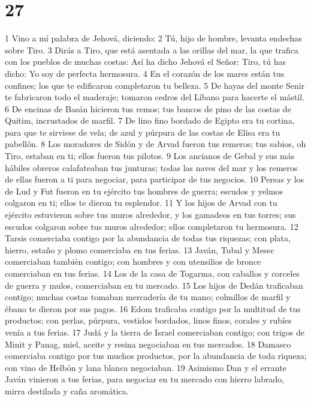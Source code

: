 \chapter{27}

1 Vino a mí palabra de Jehová, diciendo:
2 Tú, hijo de hombre, levanta endechas sobre Tiro.
3 Dirás a Tiro, que está asentada a las orillas del mar, la que trafica con los pueblos de muchas costas: Así ha dicho Jehová el Señor: Tiro, tú has dicho: Yo soy de perfecta hermosura.
4 En el corazón de los mares están tus confines; los que te edificaron completaron tu belleza.
5 De hayas del monte Senir te fabricaron todo el maderaje; tomaron cedros del Líbano para hacerte el mástil.
6 De encinas de Basán hicieron tus remos; tus bancos de pino de las costas de Quitim, incrustados de marfil.
7 De lino fino bordado de Egipto era tu cortina, para que te sirviese de vela; de azul y púrpura de las costas de Elisa era tu pabellón.
8 Los moradores de Sidón y de Arvad fueron tus remeros; tus sabios, oh Tiro, estaban en ti; ellos fueron tus pilotos.
9 Los ancianos de Gebal y sus más hábiles obreros calafateaban tus junturas; todas las naves del mar y los remeros de ellas fueron a ti para negociar, para participar de tus negocios.
10 Persas y los de Lud y Fut fueron en tu ejército tus hombres de guerra; escudos y yelmos colgaron en ti; ellos te dieron tu esplendor.
11 Y los hijos de Arvad con tu ejército estuvieron sobre tus muros alrededor, y los gamadeos en tus torres; sus escudos colgaron sobre tus muros alrededor; ellos completaron tu hermosura.
12 Tarsis comerciaba contigo por la abundancia de todas tus riquezas; con plata, hierro, estaño y plomo comerciaba en tus ferias.
13 Javán, Tubal y Mesec comerciaban también contigo; con hombres y con utensilios de bronce comerciaban en tus ferias.
14 Los de la casa de Togarma, con caballos y corceles de guerra y mulos, comerciaban en tu mercado.
15 Los hijos de Dedán traficaban contigo; muchas costas tomaban mercadería de tu mano; colmillos de marfil y ébano te dieron por sus pagos.
16 Edom traficaba contigo por la multitud de tus productos; con perlas, púrpura, vestidos bordados, linos finos, corales y rubíes venía a tus ferias.
17 Judá y la tierra de Israel comerciaban contigo; con trigos de Minit y Panag, miel, aceite y resina negociaban en tus mercados.
18 Damasco comerciaba contigo por tus muchos productos, por la abundancia de toda riqueza; con vino de Helbón y lana blanca negociaban.
19 Asimismo Dan y el errante Javán vinieron a tus ferias, para negociar en tu mercado con hierro labrado, mirra destilada y caña aromática.

